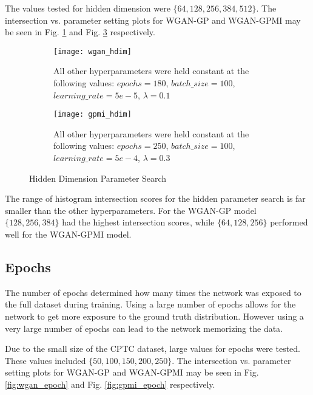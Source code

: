 The values tested for hidden dimension were $\{64, 128, 256, 384, 512\}$. The intersection vs. parameter setting plots for WGAN-GP and WGAN-GPMI may be seen in Fig. \ref{fig:wgan_hdim} and Fig. \ref{fig:gpmi_hdim} respectively.

\begin{figure}[!htbp]
	\centering
	\begin{subfigure}{.7\textwidth}
		\texttt{[image: wgan\_hdim]}
	\end{subfigure}%
	\begin{subfigure}{.3\textwidth}
		\caption{
			All other hyperparameters were held constant at the following values: $epochs=180$, $batch\_size = 100$, $learning\_rate=5e-5$, $\lambda=0.1$
		}
		\label{fig:wgan_hdim}
	\end{subfigure}%

	\begin{subfigure}{.7\textwidth}
		\texttt{[image: gpmi\_hdim]}
	\end{subfigure}%
	\begin{subfigure}{.3\textwidth}
		\caption{
			All other hyperparameters were held constant at the following values: $epochs=250$, $batch\_size=100$, $learning\_rate=5e-4$, $\lambda=0.3$
		}
		\label{fig:gpmi_hdim}
	\end{subfigure}%
	\caption{Hidden Dimension Parameter Search}
\end{figure}


The range of histogram intersection scores for the hidden parameter search is far smaller than the other hyperparameters. For the WGAN-GP model $\{128, 256, 384\}$ had the highest intersection scores, while $\{64,128,256\}$ performed well for the WGAN-GPMI model.


\subsection{Epochs}
\label{sec:epoch}

The number of epochs determined how many times the network was exposed to the full dataset during training. Using a large number of epochs allows for the network to get more exposure to the ground truth distribution. However using a very large number of epochs can lead to the network memorizing the data.

Due to the small size of the CPTC dataset, large values for epochs were tested. These values included $\{50, 100, 150, 200, 250\}$. The intersection vs. parameter setting plots for WGAN-GP and WGAN-GPMI may be seen in Fig. \ref{fig:wgan_epoch} and Fig. \ref{fig:gpmi_epoch} respectively.

